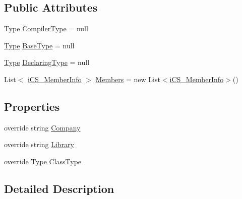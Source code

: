 \subsection*{Public Attributes}
\begin{DoxyCompactItemize}
\item 
\hyperlink{i_c_s___object_type_enum_8cs_ae6c3dd6d8597380b56d94908eb431547aa1fa27779242b4902f7ae3bdd5c6d508}{Type} \hyperlink{classi_c_s___type_info_a5a5fb932ca08cd3f82ac805448033ebb}{Compiler\+Type} = null
\item 
\hyperlink{i_c_s___object_type_enum_8cs_ae6c3dd6d8597380b56d94908eb431547aa1fa27779242b4902f7ae3bdd5c6d508}{Type} \hyperlink{classi_c_s___type_info_ab606c79dec06b45713ca377b2c3a0cf2}{Base\+Type} = null
\item 
\hyperlink{i_c_s___object_type_enum_8cs_ae6c3dd6d8597380b56d94908eb431547aa1fa27779242b4902f7ae3bdd5c6d508}{Type} \hyperlink{classi_c_s___type_info_a615906610a1efcf56bd93714dcdd5e58}{Declaring\+Type} = null
\item 
List$<$ \hyperlink{classi_c_s___member_info}{i\+C\+S\+\_\+\+Member\+Info} $>$ \hyperlink{classi_c_s___type_info_a40c8ae26aa58297f50a8a93e5893f7cc}{Members} = new List$<$\hyperlink{classi_c_s___member_info}{i\+C\+S\+\_\+\+Member\+Info}$>$()
\end{DoxyCompactItemize}
\subsection*{Properties}
\begin{DoxyCompactItemize}
\item 
override string \hyperlink{classi_c_s___type_info_a7cfe439482ac2cdd0eb2ed9bfc06ee06}{Company}
\item 
override string \hyperlink{classi_c_s___type_info_a972c93a07539fc72c6466dccaf257cbc}{Library}
\item 
override \hyperlink{i_c_s___object_type_enum_8cs_ae6c3dd6d8597380b56d94908eb431547aa1fa27779242b4902f7ae3bdd5c6d508}{Type} \hyperlink{classi_c_s___type_info_aa307f36813a63e09f6497a0d7ae46b7e}{Class\+Type}
\end{DoxyCompactItemize}


\subsection{Detailed Description}


